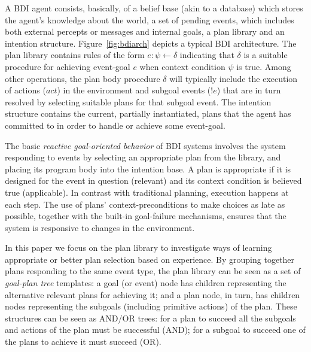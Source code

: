 A BDI agent consists, basically, of a belief base (akin to a
database) which stores the agent's knowledge about the world, a set of
pending events, which includes both external percepts or messages and
internal goals, a plan library and an intention structure.
Figure~\ref{fig:bdiarch} depicts a typical BDI architecture.
The plan library contains rules of the form $e: \psi \leftarrow
\delta$ indicating that $\delta$ is a suitable procedure for achieving
event-goal $e$ when context condition $\psi$ is true.
Among other operations, the plan body procedure $\delta$ will
typically include the 
execution of actions ($act$) in the environment and subgoal events ($!e$) that
are in turn resolved by selecting suitable plans for that subgoal
event.
%
The intention structure contains the current, partially instantiated,
plans that the agent has committed to in order to handle or
achieve some event-goal.

The basic \emph{reactive goal-oriented behavior} of BDI systems involves the
system responding to events by 
selecting an appropriate plan from the library, and placing its
program body into the intention base.
A plan is appropriate if it is designed for the event in question
(relevant) and its context
condition is believed true (applicable).
In contrast with traditional planning, execution happens at each step. The
use of plans' context-preconditions to make choices as
late as possible, together with the built-in goal-failure mechanisms, ensures
that the system is responsive to changes in the environment.

In this paper we focus on the plan library to
investigate ways of learning appropriate or better plan selection
based on experience. 
By grouping together plans responding to the same
event type, the plan library can be seen as a set of \emph{goal-plan tree}
templates: a goal (or event) node has children representing the alternative
relevant plans for achieving it; and a plan node, in turn, has children nodes
representing the subgoals (including primitive actions) of the plan.
These structures can be seen as AND/OR trees: for a plan to succeed all the
subgoals and actions of the plan must be successful (AND); for a subgoal to
succeed one of the plans to achieve it must succeed (OR).

